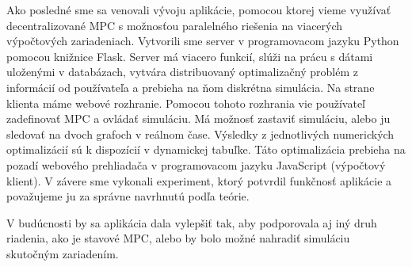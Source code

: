Ako posledné sme sa venovali vývoju aplikácie, pomocou ktorej vieme využívať decentralizované MPC s možnosťou paralelného riešenia na viacerých výpočtových zariadeniach. Vytvorili sme server v programovacom jazyku Python pomocou knižnice Flask. Server má viacero funkcií, slúži na prácu s dátami uloženými v databázach, vytvára distribuovaný optimalizačný problém z informácií od používateľa a prebieha na ňom diskrétna simulácia. Na strane klienta máme webové rozhranie. Pomocou tohoto rozhrania vie používateľ zadefinovať MPC a ovládať simuláciu. Má možnosť zastaviť simuláciu, alebo ju sledovať na dvoch grafoch v reálnom čase. Výsledky z jednotlivých numerických optimalizácií sú k dispozícií v dynamickej tabuľke. Táto optimalizácia prebieha na pozadí webového prehliadača v programovacom jazyku JavaScript (výpočtový klient). V závere sme vykonali experiment, ktorý potvrdil funkčnosť aplikácie a považujeme ju za správne navrhnutú podľa teórie. 

V budúcnosti by sa aplikácia dala vylepšiť tak, aby podporovala aj iný druh riadenia, ako je stavové MPC, alebo by bolo možné nahradiť simuláciu skutočným zariadením. 
